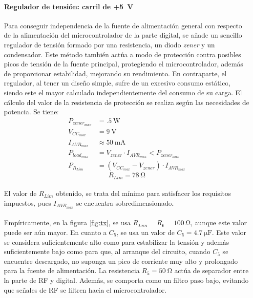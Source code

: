 \paragraph{Regulador de tensi\'on: carril de +\SI{5}{\volt}}
\paragraph{}
Para conseguir independencia de la fuente de alimentaci\'on general con respecto de la alimentaci\'on del microcontrolador de la parte digital, se añade un sencillo regulador de tensión formado por una resistencia, un diodo \textit{zener} y un condensador. 
Este método también actúa a modo de protección contra posibles picos de tensión de la fuente principal, protegiendo el microcontrolador, además de proporcionar estabilidad, mejorando su rendimiento.
En contraparte, el regulador, al tener un diseño simple, sufre de un excesivo consumo estático, siendo este el mayor calculado independientemente del consumo de su carga.
El cálculo del valor de la resistencia de protección se realiza según las necesidades de potencia. Se tiene:
\begin{align*}
   P_{zener_{max}} &= \SI{.5}{\watt} \\
   V_{CC_{max}} &= \SI{9}{\volt} \\
   I_{AVR_{max}} &\approx \SI{50}{\milli\ampere} \\
   P_{load_{max}} &= V_{zener} \cdot I_{AVR_{max}} < P_{zener_{max}}\\
   P_{R_{Lim}} &= (V_{CC_{max}} - V_{zener}) \cdot I_{AVR_{max}}
\end{align*}
\begin{equation}
   R_{Lim} = \SI{78}{\ohm}
\end{equation}
\paragraph{}
El valor de $R_{Lim}$ obtenido, se trata del m\'inimo para satisfacer los requisitos impuestos, pues $I_{AVR_{max}}$ se encuentra sobredimensionado. 
\paragraph{}
Empíricamente, en la figura \ref{fig:tx}, se usa $R_{Lim} = R_6 = \SI{100}{\ohm}$, aunque este valor puede ser aún mayor.
En cuanto a $C_5$, se usa un valor de $C_5 = \SI{4.7}{\micro\farad}$. Este valor se considera suficientemente alto como para estabilizar la tensi\'on y adem\'as suficientemente bajo como para que, al arranque del circuito, cuando $C_5$ se encuentre descargado, no suponga un pico de corriente muy alto y prolongado para la fuente de alimentaci\'on.
La resistencia $R_5 = \SI{50}{\ohm}$ act\'ua de separador entre la parte de RF y digital. Además, se comporta como un filtro paso bajo, evitando que señales de RF se filtren hacia el microcontrolador.
